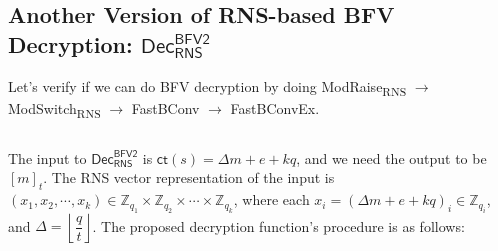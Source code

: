 \subsection{Another Version of RNS-based BFV Decryption: $\textsf{Dec}_{\textsf{RNS}}^{\textsf{BFV2}}$}
\label{subsubsec:rns-dec-bfv2}

Let's verify if we can do BFV decryption by doing \textsf{ModRaise\textsubscript{RNS}} $\rightarrow$ \textsf{ModSwitch\textsubscript{RNS}} $\rightarrow$ \textsf{FastBConv} $\rightarrow$ \textsf{FastBConvEx}. 

$ $

The input to $\textsf{Dec}_{\textsf{RNS}}^{\textsf{BFV2}}$ is $\textsf{ct}(s) = \Delta m + e + kq$, and we need the output to be $[m]_t$. The RNS vector representation of the input is $(x_1, x_2, \cdots, x_k) \in \mathbb{Z}_{q_1} \times \mathbb{Z}_{q_2} \times \cdots \times \mathbb{Z}_{q_k}$, where each $x_i = (\Delta m + e + kq)_i \in \mathbb{Z}_{q_i}$, and $\Delta = \left\lfloor\dfrac{q}{t}\right\rfloor$. The proposed  decryption function's procedure is as follows:

$ $

